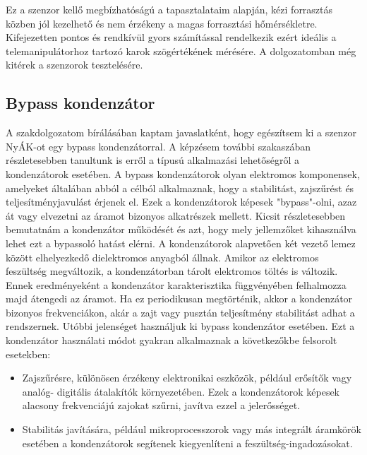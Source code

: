 Ez a szenzor kellő megbízhatóságú a tapasztalataim alapján, kézi forrasztás közben jól kezelhető és nem érzékeny a magas forrasztási hőmérsékletre. Kifejezetten pontos és rendkívül gyors számítással rendelkezik ezért ideális a telemanipulátorhoz tartozó karok szögértékének mérésére. A dolgozatomban még kitérek a szenzorok tesztelésére.

\subsection{Bypass kondenzátor}

A szakdolgozatom bírálásában kaptam javaslatként, hogy egészítsem ki a szenzor NyÁK-ot egy bypass kondenzátorral. A képzésem további szakaszában részletesebben tanultunk is erről a típusú alkalmazási lehetőségről a kondenzátorok esetében. A bypass kondenzátorok olyan elektromos komponensek, amelyeket általában abból a célból alkalmaznak, hogy a stabilitást, zajszűrést és teljesítményjavulást érjenek el. Ezek a kondenzátorok képesek "bypass"-olni, azaz át vagy elvezetni az áramot bizonyos alkatrészek mellett. Kicsit részletesebben bemutatnám a kondenzátor működését és azt, hogy mely jellemzőket kihasználva lehet ezt a bypassoló hatást elérni. A kondenzátorok alapvetően két vezető lemez között elhelyezkedő dielektromos anyagból állnak. Amikor az elektromos feszültség megváltozik, a kondenzátorban tárolt elektromos töltés is változik. Ennek eredményeként a kondenzátor karakterisztika függvényében felhalmozza majd átengedi az áramot. Ha ez periodikusan megtörténik, akkor a kondenzátor bizonyos frekvenciákon, akár a zajt vagy pusztán teljesítmény stabilitást adhat a rendszernek. Utóbbi jelenséget használjuk ki bypass kondenzátor esetében. Ezt a kondenzátor használati módot gyakran alkalmaznak a következőkbe felsorolt esetekben:

\begin{itemize}
	\item Zajszűrésre, különösen érzékeny elektronikai eszközök, például erősítők vagy analóg- digitális átalakítók környezetében. Ezek a kondenzátorok képesek alacsony frekvenciájú zajokat szűrni, javítva ezzel a jelerősséget.
	\item Stabilitás javítására, például mikroprocesszorok vagy más integrált áramkörök esetében a kondenzátorok segítenek kiegyenlíteni a feszültség-ingadozásokat.
\end{itemize}


